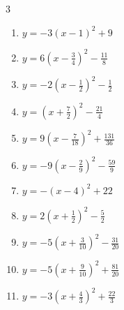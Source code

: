 \begin{multicols}{3}
\begin{enumerate}

\columnbreak %

  \item $\displaystyle y=-3\left( x-1\right)^{2}+9$

        \phantom{$\displaystyle 頂点\left( 1 , 9 \right)$}

  \item $\displaystyle y=6\left( x-\frac{3}{4}\right)^{2}-\frac{11}{8}$


  \item $\displaystyle y=-2\left( x-\frac{1}{2}\right)^{2}-\frac{1}{2}$


  \item $\displaystyle y=\left( x+\frac{7}{2}\right)^{2}-\frac{21}{4}$


  \item $\displaystyle y=9\left( x-\frac{7}{18}\right)^{2}+\frac{131}{36}$


  \item $\displaystyle y=-9\left( x-\frac{2}{9}\right)^{2}-\frac{59}{9}$


  \item $\displaystyle y=-\left( x-4\right)^{2}+22$

        \phantom{$\displaystyle 頂点\left( 4 , 22 \right)$}

  \item $\displaystyle y=2\left( x+\frac{1}{2}\right)^{2}-\frac{5}{2}$


  \item $\displaystyle y=-5\left( x+\frac{3}{10}\right)^{2}-\frac{31}{20}$


  \item $\displaystyle y=-5\left( x+\frac{9}{10}\right)^{2}+\frac{81}{20}$


  \item $\displaystyle y=-3\left( x+\frac{4}{3}\right)^{2}+\frac{22}{3}$


\end{enumerate}
\end{multicols}

